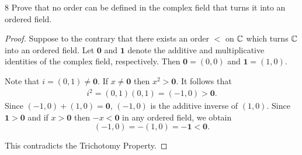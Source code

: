 \begin{exercise}{8}
Prove that no order can be defined in the complex field that turns it into an ordered field.
\end{exercise}
\begin{proof}
Suppose to the contrary that there exists an order $<$ on $\mathbb{C}$ which turns $\mathbb{C}$ into an ordered field.
Let $\mathbf{0}$ and $\mathbf{1}$ denote the additive and multiplicative identities of the complex field, respectively. 
Then $\mathbf{0}=(0,0)$ and $\mathbf{1}=(1,0)$. 

Note that $i = (0,1) \neq \mathbf{0}$.
If $x \neq \mathbf{0}$ then $x^2 > \mathbf{0}$. 
It follows that
\begin{align*}
    i^2=(0,1)(0,1)=(-1,0)>\mathbf{0}.
\end{align*}
Since $(-1,0)+(1,0)=\mathbf{0}$, $(-1,0)$ is the additive inverse of $(1,0)$. 
Since $\mathbf{1}>\mathbf{0}$ and if $x>\mathbf{0}$ then $-x<\mathbf{0}$ in any ordered field, we obtain
\[
(-1,0)=-(1,0)=-\mathbf{1}<\mathbf{0}.
\]

This contradicts the Trichotomy Property. 
\end{proof}